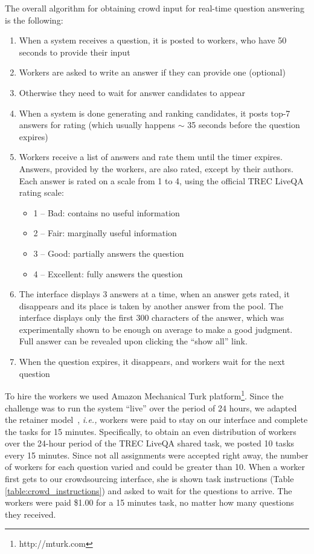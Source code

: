 \documentclass[letterpaper]{article}
\makeatletter
\newcommand{\ie}{\textit{i.e.,}\@\xspace}
\makeatother
\begin{document}
The overall algorithm for obtaining crowd input for real-time question answering is the following:
\begin{enumerate}
\item When a system receives a question, it is posted to workers, who have 50 seconds to provide their input
\item Workers are asked to write an answer if they can provide one (optional)
\item Otherwise they need to wait for answer candidates to appear
\item When a system is done generating and ranking candidates, it posts top-7 answers for rating (which usually happens $\sim$ 35 seconds before the question expires)
\item Workers receive a list of answers and rate them until the timer expires. Answers, provided by the workers, are also rated, except by their authors. Each answer is rated on a scale from 1 to 4, using the official TREC LiveQA rating scale:
	\begin{itemize}[noitemsep,topsep=0pt]
    \item 1 -- Bad: contains no useful information
    \item 2 -- Fair: marginally useful information
    \item 3 -- Good: partially answers the question
    \item 4 -- Excellent: fully answers the question
    \end{itemize}
\item The interface displays 3 answers at a time, when an answer gets rated, it disappears and its place is taken by another answer from the pool. The interface displays only the first 300 characters of the answer, which was experimentally shown to be enough on average to make a good judgment.
Full answer can be revealed upon clicking the ``show all'' link.
\item When the question expires, it disappears, and workers wait for the next question
\end{enumerate}

To hire the workers we used Amazon Mechanical Turk platform\footnote{http://mturk.com}.
Since the challenge was to run the system ``live'' over the period of 24 hours, we adapted the retainer model~\cite{bernstein2011crowds,bigham2010vizwiz}, \ie workers were paid to stay on our interface and complete the tasks for 15 minutes.
Specifically, to obtain an even distribution of workers over the 24-hour period of the TREC LiveQA shared task, we posted 10 tasks every 15 minutes.
Since not all assignments were accepted right away, the number of workers for each question varied and could be greater than 10.
When a worker first gets to our crowdsourcing interface, she is shown task instructions (Table \ref{table:crowd_instructions}) and asked to wait for the questions to arrive.
The workers were paid \$1.00 for a 15 minutes task, no matter how many questions they received.
\end{document}
